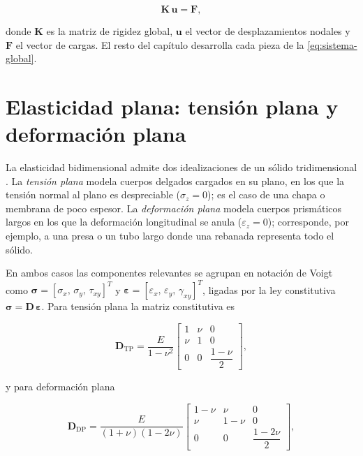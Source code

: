 \begin{equation}
\bm{K}\,\bm{u} = \bm{F},
\label{eq:sistema-global}
\end{equation}

donde $\bm{K}$ es la matriz de rigidez global, $\bm{u}$ el vector de desplazamientos nodales y $\bm{F}$ el vector de cargas. El resto del capítulo desarrolla cada pieza de la \autoref{eq:sistema-global}.

\section{Elasticidad plana: tensión plana y deformación plana}
\label{sec:elasticidad-plana}

La elasticidad bidimensional admite dos idealizaciones de un sólido tridimensional \autocites[pp.~11-12]{timoshenko1970elasticity}[pp.~79, 94]{cook2002concepts}. La \emph{tensión plana} modela cuerpos delgados cargados en su plano, en los que la tensión normal al plano es despreciable ($\sigma_z = 0$); es el caso de una chapa o membrana de poco espesor. La \emph{deformación plana} modela cuerpos prismáticos largos en los que la deformación longitudinal se anula ($\varepsilon_z = 0$); corresponde, por ejemplo, a una presa o un tubo largo donde una rebanada representa todo el sólido.

En ambos casos las componentes relevantes se agrupan en notación de Voigt como $\bm{\sigma} = [\sigma_x,\, \sigma_y,\, \tau_{xy}]^T$ y $\bm{\varepsilon} = [\varepsilon_x,\, \varepsilon_y,\, \gamma_{xy}]^T$, ligadas por la ley constitutiva $\bm{\sigma} = \bm{D}\,\bm{\varepsilon}$. Para tensión plana la matriz constitutiva es

\begin{equation}
\bm{D}_{\text{TP}} = \frac{E}{1-\nu^{2}}
\begin{bmatrix}
1 & \nu & 0 \\
\nu & 1 & 0 \\
0 & 0 & \dfrac{1-\nu}{2}
\end{bmatrix},
\label{eq:D-tension-plana}
\end{equation}

y para deformación plana

\begin{equation}
\bm{D}_{\text{DP}} = \frac{E}{(1+\nu)(1-2\nu)}
\begin{bmatrix}
1-\nu & \nu & 0 \\
\nu & 1-\nu & 0 \\
0 & 0 & \dfrac{1-2\nu}{2}
\end{bmatrix},
\label{eq:D-deformacion-plana}
\end{equation}

